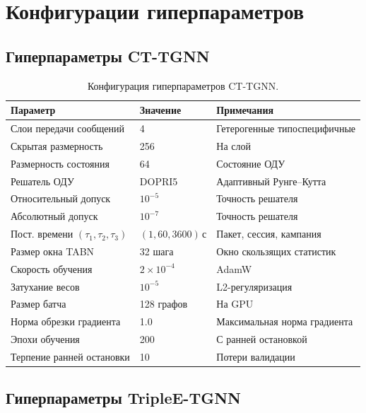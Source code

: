 \section{Конфигурации гиперпараметров}
\label{app:hyperparams}

\subsection{Гиперпараметры CT-TGNN}
\label{app:hp_cttgnn}

\begin{table}[htbp]
\centering
\caption{Конфигурация гиперпараметров CT-TGNN.}
\label{tab:hp_cttgnn}
\begin{tabular}{lll}
\toprule
Параметр & Значение & Примечания \\
\midrule
Слои передачи сообщений    & 4     & Гетерогенные типоспецифичные \\
Скрытая размерность        & 256   & На слой \\
Размерность состояния      & 64    & Состояние ОДУ \\
Решатель ОДУ               & DOPRI5 & Адаптивный Рунге--Кутта \\
Относительный допуск       & $10^{-5}$ & Точность решателя \\
Абсолютный допуск          & $10^{-7}$ & Точность решателя \\
Пост. времени $(\tau_1,\tau_2,\tau_3)$ & $(1,60,3600)$\,с & Пакет, сессия, кампания \\
Размер окна TABN           & 32 шага & Окно скользящих статистик \\
Скорость обучения          & $2\times10^{-4}$ & AdamW \\
Затухание весов            & $10^{-5}$ & L2-регуляризация \\
Размер батча               & 128 графов & На GPU \\
Норма обрезки градиента    & 1.0   & Максимальная норма градиента \\
Эпохи обучения             & 200   & С ранней остановкой \\
Терпение ранней остановки  & 10    & Потери валидации \\
\bottomrule
\end{tabular}
\end{table}


\subsection{Гиперпараметры TripleE-TGNN}
\label{app:hp_triplee}

